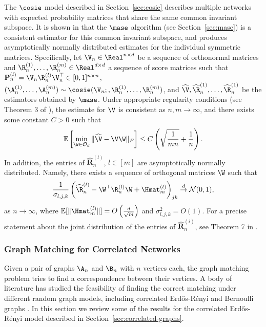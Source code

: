 The $\cosie$ model described in Section~\ref{sec:cosie} describes multiple networks with expected probability matrices that share the same common invariant subspace. It is shown in \cite{arroyo2019inference} that the $\mase$ algorithm (see Section~\ref{sec:mase}) is a consistent estimator for this common invariant subspace, and produces asymptotically normally distributed estimates for the individual symmetric matrices. Specifically, let $\V_n\in\Real^{n\times d}$ be
a sequence of orthonormal matrices and $\R^{(1)}_n, \ldots, \R^{(m)}_n\in\Real^{d\times d}$ a sequence of score matrices such that $\mathbf{P}^{(l)}_n=\V_n\R^{(l)}_n\V_n^\top\in[0,1]^{n\times n} $, $(\A_n^{(1)}, \ldots, \A_n^{(m)})\sim \cosie(\V_n;, \R^{(1)}_n, \ldots, \R^{(m)}_n)$, and $\widehat{\V}, \widehat{\R}^{(1)}_n, \ldots, \widehat{\R}^{(1)}_n$ be the estimators obtained by $\mase$. Under appropriate regularity conditions (see Theorem 3 of \cite{arroyo2019inference}), the estimate for $\V$ is consistent as $n,m\rightarrow\infty$, and there exists some constant $C>0$ such that
        \begin{equation*}
			\mathbb{E}\left[\min_{\W\in\mathcal{O}_d}\|\widehat{\V}-\V\W\|_F\right] \leq C\left(\sqrt{\frac{1}{mn}} + {\frac{1}{n}}\right). \label{eq:theorem-bound}
		\end{equation*}
    In addition, the entries of $\widehat{\mathbf{R}}^{(l)}_n$, $l\in[m]$ are asymptotically normally distributed. Namely, there exists a sequence of orthogonal matrices $\W$ such that
		$$\frac{1}{\sigma_{l,j,k}}\left(\widehat{\R}^{(l)}_n - \W^\top\R^{(l)}_n\W + \Hmat_m^{(l)}\right)_{jk} \overset{d}{\rightarrow} \mathcal{N}(0, 1), $$
		as $n\rightarrow\infty$, where
		$\mathbb{E}[\|\Hmat_m^{(l)}\|]=O\left(\frac{d}{\sqrt{m}}\right)$ and $\sigma^2_{l,j,k} = O(1)$. 
		For a  precise statement about the joint distribution of the entries of $\widehat{\mathbf{R}}_n^{(i)}$, see Theorem 7 in \cite{arroyo2019inference}.


\subsubsection{Graph Matching for Correlated Networks } Given a pair of graphs $\A_n$ and $\B_n$ with $n$ vertices each, the graph matching problem tries to find a correspondence between their vertices. A body of literature has studied the feasibility of finding the correct matching under different random graph models, including correlated  Erd\H{o}s-R\'enyi  \cite{Lyzinski2013-fq,cullina2016improved} and Bernoulli graphs
\cite{lyzinski2015graph}. In this section we review some of the results for the correlated Erd\H{o}s-R\'enyi model described in Section~\ref{sec:correlated-graphs}.

